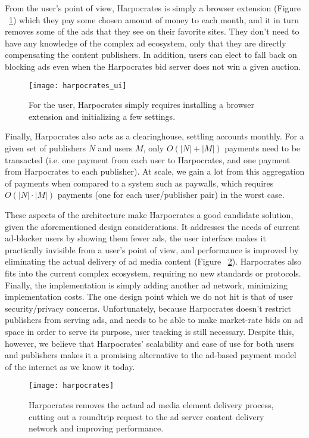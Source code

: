 From the user's point of view, Harpocrates is simply a browser extension  (Figure ~\ref{fig:harpocrates_ui}) which they pay some chosen amount of money to each month, and it in turn removes some of the ads that they see on their favorite sites.
They don't need to have any knowledge of the complex ad ecosystem, only that they are directly compensating the content publishers.
In addition, users can elect to fall back on blocking ads even when the Harpocrates bid server does not win a given auction.

\begin{figure}[h]
\centering
\texttt{[image: harpocrates\_ui]}
\caption{For the user, Harpocrates simply requires installing a browser extension and initializing a few settings.}
\label{fig:harpocrates_ui}
\end{figure}

Finally, Harpocrates also acts as a clearinghouse, settling accounts monthly.
For a given set of publishers $N$ and users $M$, only $O(|N| + |M|)$ payments need to be transacted (i.e. one payment from each user to Harpocrates, and one payment from Harpocrates to each publisher).
At scale, we gain a lot from this aggregation of payments when compared to a system such as paywalls, which requires $O(|N| \cdot |M|)$ payments (one for each user/publisher pair) in the worst case.

These aspects of the architecture make Harpocrates a good candidate solution, given the aforementioned design considerations.
It addresses the needs of current ad-blocker users by showing them fewer ads, the user interface makes it practically invisible from a user's point of view, and performance is improved by eliminating the actual delivery of ad media content (Figure ~\ref{fig:harpocrates}).
Harpocrates also fits into the current complex ecosystem, requiring no new standards or protocols.
Finally, the implementation is simply adding another ad network, minimizing implementation costs.
The one design point which we do not hit is that of user security/privacy concerns.
Unfortunately, because Harpocrates doesn't restrict publishers from serving ads, and needs to be able to make market-rate bids on ad space in order to serve its purpose, user tracking is still necessary.
Despite this, however, we believe that Harpocrates' scalability and ease of use for both users and publishers makes it a promising alternative to the ad-based payment model of the internet as we know it today.

\begin{figure}[h]
\centering
\texttt{[image: harpocrates]}
\caption{Harpocrates removes the actual ad media element delivery process, cutting out a roundtrip request to the ad server content delivery network and improving performance.}
\label{fig:harpocrates}
\end{figure}

